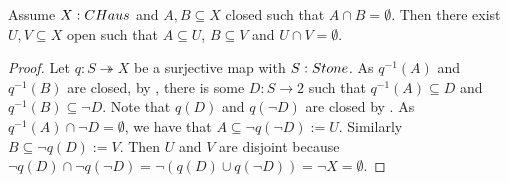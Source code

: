 \begin{lemma}\label{CHausSeperationOfClosedByOpens}
 Assume $X:\CHaus$ and $A,B\subseteq X$ closed such that $A\cap B=\emptyset$. 
  Then there exist $U,V\subseteq X$ open such that $A\subseteq U$, $B\subseteq V$ and $U\cap V=\emptyset$. 
\end{lemma}
\begin{proof}
  Let $q:S\twoheadrightarrow X$ be a surjective map with $S:\Stone$.
  As $q^{-1}(A)$ and $q^{-1}(B)$ are closed, 
  by , there is some $D:S \to 2$ such that
  $q^{-1}(A) \subseteq D$ and $q^{-1}(B) \subseteq \neg D$. 
  Note that $q(D)$ and $q(\neg D)$ are closed by . 
  As $q^{-1}(A) \cap \neg D  =\emptyset$, we have that 
  $A\subseteq \neg q(\neg D):=U$. 
  Similarly $B\subseteq \neg q(D):=V$. 
  Then $U$ and $V$ are disjoint because $\neg q(D)\cap \neg q(\neg D) = \neg (q(D)\cup q(\neg D)) = \neg X = \emptyset$.
\end{proof}


